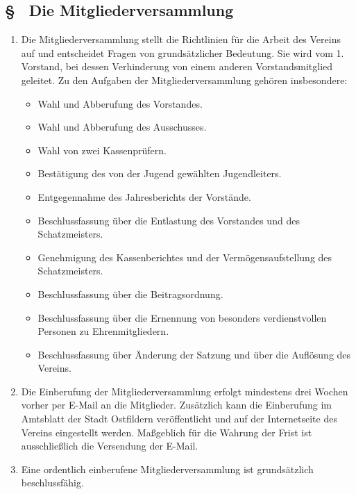 \subsection{§ \thesaparagraphcounter\ Die Mitgliederversammlung} \label{sa:par:mitgliederversammlung}
\begin{enumerate}
    \item \label{sa:abs:7h0aol} Die Mitgliederversammlung stellt die Richtlinien für die Arbeit des Vereins auf und entscheidet Fragen von grundsätzlicher Bedeutung. Sie wird vom 1. Vorstand, bei dessen Verhinderung von einem anderen Vorstandsmitglied geleitet. Zu den Aufgaben der Mitgliederversammlung gehören insbesondere:
    \begin{itemize}
        \item Wahl und Abberufung des Vorstandes.
        \item Wahl und Abberufung des Ausschusses.
        \item Wahl von zwei Kassenprüfern.
        \item Bestätigung des von der Jugend gewählten Jugendleiters.
        \item Entgegennahme des Jahresberichts der Vorstände.
        \item Beschlussfassung über die Entlastung des Vorstandes und des Schatzmeisters.
        \item Genehmigung des Kassenberichtes und der Vermögensaufstellung des Schatzmeisters.
        \item Beschlussfassung über die Beitragsordnung.
        \item Beschlussfassung über die Ernennung von besonders verdienstvollen Personen zu Ehrenmitgliedern.
        \item Beschlussfassung über Änderung der Satzung und über die Auflösung des Vereins.
    \end{itemize}

    \item \label{sa:abs:uj81ef} Die Einberufung der Mitgliederversammlung erfolgt mindestens drei Wochen vorher per E-Mail an die Mitglieder. Zusätzlich kann die Einberufung im Amtsblatt der Stadt Ostfildern veröffentlicht und auf der Internetseite des Vereins eingestellt werden. Maßgeblich für die Wahrung der Frist ist ausschließlich die Versendung der E-Mail.

    \item \label{sa:abs:wx4dlu} Eine ordentlich einberufene Mitgliederversammlung ist grundsätzlich beschlussfähig.


\end{enumerate}
